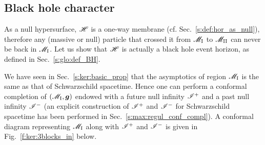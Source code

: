 \subsection{Black hole character} \label{s:ker:event_hor}

As a null hypersurface, $\mathscr{H}$ is a one-way membrane (cf. Sec.~\ref{s:def:hor_as_null}),
therefore any (massive or null) particle that crossed it from $\mathscr{M}_{\rm I}$ to
$\mathscr{M}_{\rm II}$ can never be back in $\mathscr{M}_{\rm I}$. Let us show that $\mathscr{H}$
is actually a black hole event horizon, as defined in Sec.~\ref{s:glo:def_BH}.

We have seen in Sec.~\ref{s:ker:basic_prop} that the asymptotics of region $\mathscr{M}_{\rm I}$
is the same as that of Schwarzschild spacetime. Hence one can perform a conformal
completion of $(\mathscr{M}_{\rm I},\bm{g})$ endowed with a future null infinity $\mathscr{I}^+$
and a past null infinity $\mathscr{I}^-$ (an explicit construction of $\mathscr{I}^+$ and
$\mathscr{I}^-$ for Schwarzschild spacetime has been performed in
Sec.~\ref{s:max:regul_conf_compl}). A conformal diagram representing $\mathscr{M}_{\rm I}$
along with $\mathscr{I}^+$
and $\mathscr{I}^-$ is given in Fig.~\ref{f:ker:3blocks_in} below.


